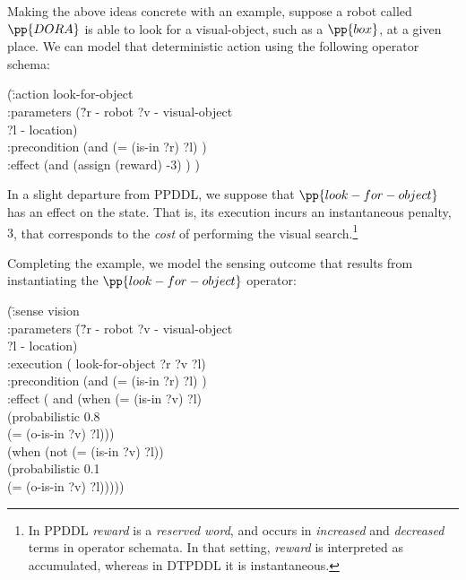 
Making the above ideas concrete with an example, suppose a robot
called $\pp{DORA}$ is able to look for a visual-object, such as a
$\pp{box}$, at a given place. We can model that deterministic action
using the following operator schema:


\small
\begin{tabtt}
(\=:action look-for-object \+ \\
   :parameters (\=?r - robot ?v - visual-object\\
   \> ?l - location) \\
   :precondition (and (= (is-in ?r) ?l) ) \\
   :effect (and (assign (reward) -3) ) ) \\
\end{tabtt}
\normalsize


\noindent In a slight departure from PPDDL, we suppose that
$\pp{look-for-object}$ has an effect on the state. That is, its
execution incurs an instantaneous penalty, $3$, that corresponds to
the {\em cost} of performing the visual search.\footnote{In PPDDL {\em
reward} is a {\em reserved word}, and occurs in {\em increased} and
{\em decreased} terms in operator schemata. In that setting, {\em
reward} is interpreted as accumulated, whereas in DTPDDL it is
instantaneous.}

Completing the example, we model the sensing outcome that results from
instantiating the $\pp{look-for-object}$ operator:

\small
\begin{tabtt}
(\= :sense vision \+\\
 :parameters \= (\= ?r - robot ?v - visual-object\\
 \>\>  ?l - location) \\
 :execution \> ( \> look-for-object ?r ?v ?l) \\
 :precondition (and (= (is-in ?r) ?l) ) \\
 :effect \>  (  \> and (when (= (is-in ?v) ?l) \\
   \> \> (probabilistic 0.8 \\
   \>  \>(= (o-is-in ?v) ?l))) \\
  \> (when (not (= (is-in ?v) ?l)) \\
   \>  \> (probabilistic 0.1 \\
   \>  \> (= (o-is-in ?v) ?l))))) \\
\end{tabtt}
\normalsize


